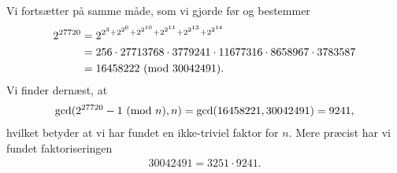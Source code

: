 \begin{example}
Vi fortsætter på samme måde, som vi gjorde før og bestemmer
\begin{align*}
	2^{27720} &= 2^{2^3 + 2^{2^6} + 2^{2^{10}} + 2^{2^{11}} + 2^{2^{13}} + 2^{2^{14}}} \\
	&= 256 \cdot 27713768 \cdot 3779241 \cdot 11677316 \cdot 8658967 \cdot 3783587 \\
	&= 16458222 \ (\mathrm{mod} \ 30042491).
\end{align*}
Vi finder dernæst, at
\begin{align*}
	\gcd(2^{27720} - 1 \ (\mathrm{mod} \ n), n) = \gcd(16458221, 30042491) = 9241,
\end{align*}
hvilket betyder at vi har fundet en ikke-triviel faktor for $n$. Mere præcist har vi fundet faktoriseringen
\begin{align*}
	30042491 = 3251 \cdot 9241.
\end{align*}

\end{example}